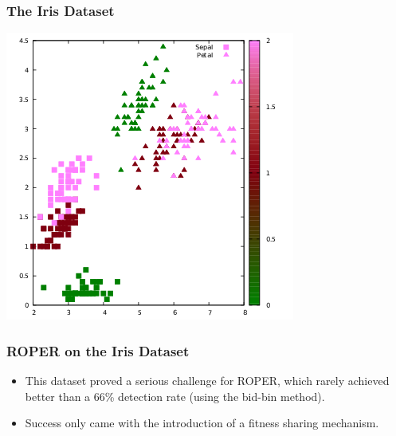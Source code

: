 \documentclass[11pt]{article}
\begin{document}
\subsubsection*{The Iris Dataset}
\label{sec:org9ce225f}
\begin{center}
\includegraphics[width=.9\linewidth]{../images/plots/iris_plot.png}
\end{center}

\subsubsection*{ROPER on the Iris Dataset}
\label{sec:orgde4f25c}
\begin{itemize}
\item This dataset proved a serious challenge for ROPER, which rarely achieved better than a 66\% detection rate (using the bid-bin method).
\item Success only came with the introduction of a fitness sharing mechanism.
\end{itemize}
\end{document}
